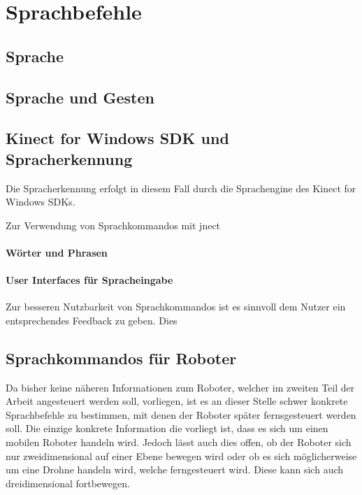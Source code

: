 \chapter{Sprachbefehle}
\label{chap:Sprachbefehle}

\section{Sprache}
\section{Sprache und Gesten}
\section{Kinect for Windows SDK und Spracherkennung}

Die Spracherkennung erfolgt in diesem Fall durch die Sprachengine des Kinect for Windows SDKs.

Zur Verwendung von Sprachkommandos mit jnect 

\subsubsection{W\"orter und Phrasen}



\subsubsection{User Interfaces f\"ur Spracheingabe}
Zur besseren Nutzbarkeit von Sprachkommandos ist es sinnvoll dem Nutzer ein entsprechendes Feedback zu geben. Dies

\section{Sprachkommandos f\"ur Roboter}

Da bisher keine n\"aheren Informationen zum Roboter, welcher im zweiten Teil der Arbeit angesteuert werden soll, vorliegen, ist es an dieser Stelle schwer 
konkrete Sprachbefehle zu bestimmen, mit denen der Roboter sp\"ater fernsgesteuert werden soll.
Die einzige konkrete Information die vorliegt ist, dass es sich um einen mobilen Roboter handeln wird. 
Jedoch l\"asst auch dies offen, ob der Roboter sich nur zweidimensional auf einer Ebene bewegen wird oder ob es sich m\"oglicherweise um eine Drohne 
handeln wird, welche ferngesteuert wird. Diese kann sich auch dreidimensional fortbewegen.
\par\smallskip 

